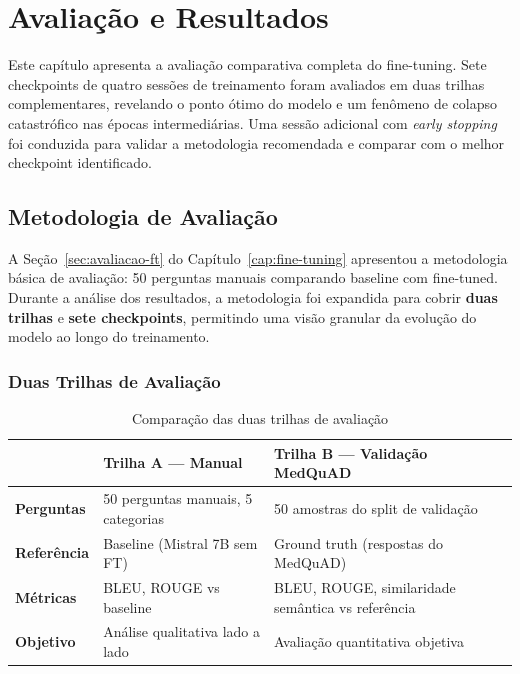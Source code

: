
\chapter{Avaliação e Resultados}
\label{cap:avaliacao}

Este capítulo apresenta a avaliação comparativa completa do fine-tuning. Sete checkpoints de quatro sessões de treinamento foram avaliados em duas trilhas complementares, revelando o ponto ótimo do modelo e um fenômeno de colapso catastrófico nas épocas intermediárias. Uma sessão adicional com \textit{early stopping} foi conduzida para validar a metodologia recomendada e comparar com o melhor checkpoint identificado.

\section{Metodologia de Avaliação}
\label{sec:metodologia-avaliacao}

A Seção~\ref{sec:avaliacao-ft} do Capítulo~\ref{cap:fine-tuning} apresentou a metodologia básica de avaliação: 50 perguntas manuais comparando baseline com fine-tuned. Durante a análise dos resultados, a metodologia foi expandida para cobrir \textbf{duas trilhas} e \textbf{sete checkpoints}, permitindo uma visão granular da evolução do modelo ao longo do treinamento.

\subsection{Duas Trilhas de Avaliação}

\begin{table}[H]
\centering
\caption{Comparação das duas trilhas de avaliação}
\label{tab:trilhas-avaliacao}
\begin{tabularx}{\textwidth}{lXX}
\toprule
& \textbf{Trilha A --- Manual} & \textbf{Trilha B --- Validação MedQuAD} \\
\midrule
\textbf{Perguntas} & 50 perguntas manuais, 5 categorias & 50 amostras do split de validação \\
\textbf{Referência} & Baseline (Mistral 7B sem FT) & Ground truth (respostas do MedQuAD) \\
\textbf{Métricas} & BLEU, ROUGE vs baseline & BLEU, ROUGE, similaridade semântica vs referência \\
\textbf{Objetivo} & Análise qualitativa lado a lado & Avaliação quantitativa objetiva \\
\bottomrule
\end{tabularx}
\end{table}

